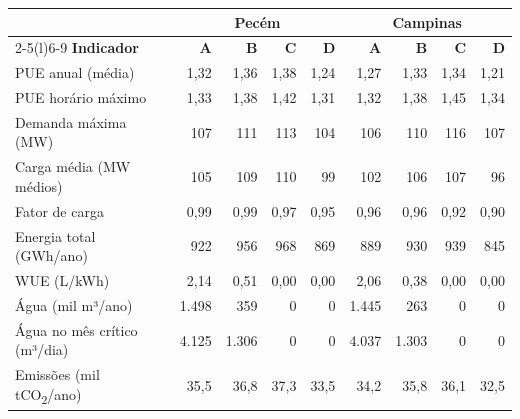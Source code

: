 \begin{tabular}{@{}lrrrrrrrr@{}}
		\toprule
		 & \multicolumn{4}{c}{\textbf{Pecém}} & \multicolumn{4}{c}{\textbf{Campinas}} \\
		\cmidrule(lr){2-5}\cmidrule(l){6-9}
		\textbf{Indicador} & \textbf{A} & \textbf{B} & \textbf{C} & \textbf{D} & \textbf{A} & \textbf{B} & \textbf{C} & \textbf{D} \\
		\midrule
		PUE anual (média) & 1,32 & 1,36 & 1,38 & 1,24 & 1,27 & 1,33 & 1,34 & 1,21 \\
		PUE horário máximo & 1,33 & 1,38 & 1,42 & 1,31 & 1,32 & 1,38 & 1,45 & 1,34 \\
		Demanda máxima (MW) & 107 & 111 & 113 & 104 & 106 & 110 & 116 & 107 \\
		Carga média (MW médios) & 105 & 109 & 110 & 99 & 102 & 106 & 107 & 96 \\
		Fator de carga & 0,99 & 0,99 & 0,97 & 0,95 & 0,96 & 0,96 & 0,92 & 0,90 \\
		Energia total (GWh/ano) & 922 & 956 & 968 & 869 & 889 & 930 & 939 & 845 \\
		WUE (L/kWh) & 2,14 & 0,51 & 0,00 & 0,00 & 2,06 & 0,38 & 0,00 & 0,00 \\
		Água (mil m³/ano) & 1.498 & 359 & 0 & 0 & 1.445 & 263 & 0 & 0 \\
		Água no mês crítico (m³/dia) & 4.125 & 1.306 & 0 & 0 & 4.037 & 1.303 & 0 & 0 \\
		Emissões (mil tCO\textsubscript{2}/ano) & 35,5 & 36,8 & 37,3 & 33,5 & 34,2 & 35,8 & 36,1 & 32,5 \\
		\bottomrule
	\end{tabular}
